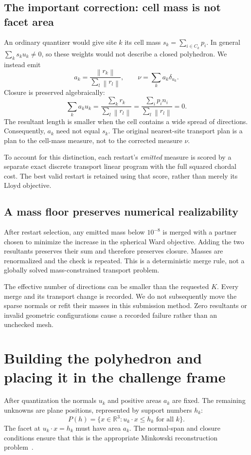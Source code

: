 \documentclass[11pt,a4paper]{article}
\newcommand{\R}{\mathbb{R}}
\newcommand{\norm}[1]{\left\lVert#1\right\rVert}
\begin{document}
\subsection*{The important correction: cell mass is not facet area}
An ordinary quantizer would give site $k$ its cell mass $s_k=\sum_{i\in C_k}p_i$. In general $\sum_k s_k u_k\ne0$, so these weights would not describe a closed polyhedron. We instead emit
\begin{equation}
 a_k=\frac{\norm{r_k}}{\sum_l\norm{r_l}},\qquad
 \nu=\sum_k a_k\delta_{u_k}.
 \label{eq:emitted}
\end{equation}
Closure is preserved algebraically:
\begin{equation}
 \sum_k a_k u_k
 =\frac{\sum_k r_k}{\sum_l\norm{r_l}}
 =\frac{\sum_i p_i n_i}{\sum_l\norm{r_l}}=0.
 \label{eq:resultantclosure}
\end{equation}
The resultant length is smaller when the cell contains a wide spread of directions. Consequently, $a_k$ need not equal $s_k$. The original nearest-site transport plan is a plan to the cell-mass measure, not to the corrected measure $\nu$.

To account for this distinction, each restart's \emph{emitted} measure is scored by a separate exact discrete transport linear program with the full squared chordal cost. The best valid restart is retained using that score, rather than merely its Lloyd objective.

\subsection*{A mass floor preserves numerical realizability}
After restart selection, any emitted mass below $10^{-8}$ is merged with a partner chosen to minimize the increase in the spherical Ward objective. Adding the two resultants preserves their sum and therefore preserves closure. Masses are renormalized and the check is repeated. This is a deterministic merge rule, not a globally solved mass-constrained transport problem.

The effective number of directions can be smaller than the requested $K$. Every merge and its transport change is recorded. We do not subsequently move the sparse normals or refit their masses in this submission method. Zero resultants or invalid geometric configurations cause a recorded failure rather than an unchecked mesh.

\clearpage
\section{Building the polyhedron and placing it in the challenge frame}
After quantization the normals $u_k$ and positive areas $a_k$ are fixed. The remaining unknowns are plane positions, represented by support numbers $h_k$:
\begin{equation}
 P(h)=\{x\in\R^3:u_k\cdot x\leq h_k\text{ for all }k\}.
 \label{eq:polytope}
\end{equation}
The facet at $u_k\cdot x=h_k$ must have area $a_k$. The normal-span and closure conditions ensure that this is the appropriate Minkowski reconstruction problem~\cite{sellaroli2017}.
\end{document}
